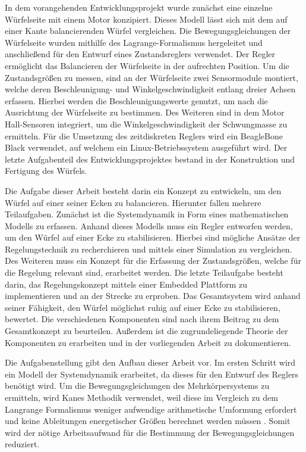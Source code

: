 In dem vorangehenden Entwicklungsprojekt wurde zunächst eine einzelne Würfelseite mit einem Motor konzipiert. Dieses Modell lässt sich mit dem auf einer Kante balancierenden Würfel vergleichen. Die Bewegungsgleichungen der Würfelseite wurden mithilfe des Lagrange-Formalismus hergeleitet und anschließend für den Entwurf eines Zustandsreglers verwendet. Der Regler ermöglicht das Balancieren der Würfelseite in der aufrechten Position. Um die Zustandsgrößen zu messen, sind an der Würfelseite zwei Sensormodule montiert, welche deren Beschleunigung- und Winkelgeschwindigkeit entlang dreier Achsen erfassen. Hierbei werden die Beschleunigungswerte genutzt, um nach \cite{Cubli1} die Ausrichtung der Würfelseite zu bestimmen. Des Weiteren sind in dem Motor Hall-Sensoren integriert, um die Winkelgeschwindigkeit der Schwungmasse zu ermitteln. Für die Umsetzung des zeitdiskreten Reglers wird ein BeagleBone Black verwendet, auf welchem ein Linux-Betriebssystem ausgeführt wird. Der letzte Aufgabenteil des Entwicklungsprojektes bestand in der Konstruktion und Fertigung des Würfels.

Die Aufgabe dieser Arbeit besteht darin ein Konzept zu entwickeln, um den Würfel auf einer seiner Ecken zu balancieren. Hierunter fallen mehrere Teilaufgaben. Zunächst ist die Systemdynamik in Form eines mathematischen Modells zu erfassen. Anhand dieses Modells muss ein Regler entworfen werden, um den Würfel auf einer Ecke zu stabilisieren. Hierbei sind mögliche Ansätze der Regelungstechnik zu recherchieren und mittels einer Simulation zu vergleichen. Des Weiteren muss ein Konzept für die Erfassung der Zustandsgrößen, welche für die Regelung relevant sind, erarbeitet werden. Die letzte Teilaufgabe besteht darin, das Regelungskonzept mittels einer Embedded Plattform zu implementieren und an der Strecke zu erproben. Das Gesamtsystem wird anhand seiner Fähigkeit, den Würfel möglichst ruhig auf einer Ecke zu stabilisieren, bewertet. Die verschiedenen Komponenten sind nach ihrem Beitrag zu dem Gesamtkonzept zu beurteilen. Außerdem ist die zugrundeliegende Theorie der Komponenten zu erarbeiten und in der vorliegenden Arbeit zu dokumentieren.

Die Aufgabenstellung gibt den Aufbau dieser Arbeit vor. Im ersten Schritt wird ein Modell der Systemdynamik erarbeitet, da dieses für den Entwurf des Reglers benötigt wird. Um die Bewegungsgleichungen des Mehrkörpersystems zu ermitteln, wird Kanes Methodik \cite{KaneBook} verwendet, weil diese im Vergleich zu dem Langrange Formalismus weniger aufwendige arithmetische Umformung erfordert und keine Ableitungen energetischer Größen berechnet werden müssen \cite[S. 61 ff.]{Zetina}. Somit wird der nötige Arbeitsaufwand für die Bestimmung der Bewegungsgleichungen reduziert.

